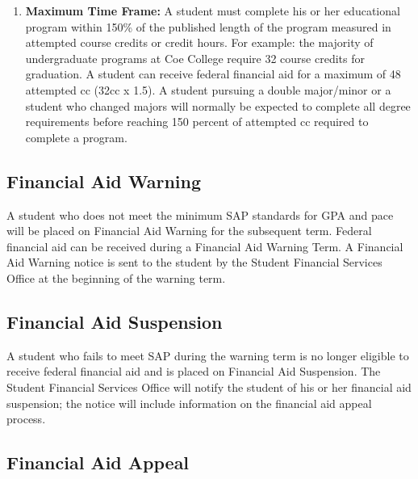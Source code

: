 \documentclass[
  letterpaper,
]{scrbook}
\providecommand{\tightlist}{%
  \setlength{\itemsep}{0pt}\setlength{\parskip}{0pt}}
\begin{document}
\begin{enumerate}
\def\labelenumi{\arabic{enumi}.}
\setcounter{enumi}{2}
\tightlist
\item
  \textbf{Maximum Time Frame:} A student must complete his or her
  educational program within 150\% of the published length of the
  program measured in attempted course credits or credit hours. For
  example: the majority of undergraduate programs at Coe College require
  32 course credits for graduation. A student can receive federal
  financial aid for a maximum of 48 attempted cc (32cc x 1.5). A student
  pursuing a double major/minor or a student who changed majors will
  normally be expected to complete all degree requirements before
  reaching 150 percent of attempted cc required to complete a program.
\end{enumerate}

\subsection{\texorpdfstring{\textbf{Financial Aid
Warning}}{Financial Aid Warning}}\label{financial-aid-warning}

A student who does not meet the minimum SAP standards for GPA and pace
will be placed on Financial Aid Warning for the subsequent term. Federal
financial aid can be received during a Financial Aid Warning Term. A
Financial Aid Warning notice is sent to the student by the Student
Financial Services Office at the beginning of the warning term.

\subsection{\texorpdfstring{\textbf{Financial Aid
Suspension}}{Financial Aid Suspension}}\label{financial-aid-suspension}

A student who fails to meet SAP during the warning term is no longer
eligible to receive federal financial aid and is placed on Financial Aid
Suspension. The Student Financial Services Office will notify the
student of his or her financial aid suspension; the notice will include
information on the financial aid appeal process.

\subsection{\texorpdfstring{\textbf{Financial Aid
Appeal}}{Financial Aid Appeal}}\label{financial-aid-appeal}
\end{document}
